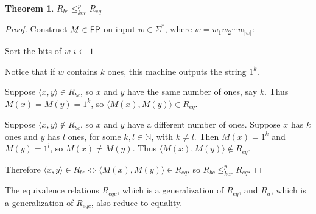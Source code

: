 \documentclass{article}
\newtheorem{theorem}{Theorem}[section]
\theoremstyle{definition} \newtheorem{definition}[definition]{Definition}
\newcommand{\sigmastar}{\Sigma^{*}} %
\newcommand{\kr}{\leq^{p}_{ker}} %
\newcommand{\pair}[2]{\langle#1,#2\rangle} %
\begin{document}
\begin{theorem}$R_{bc}\kr R_{eq}$\end{theorem}
\begin{proof}
  Construct $M\in {\ensuremath{\mathsf{FP}}}$ on input $w\in\sigmastar$, where $w=w_1w_2\cdots
  w_{|w|}$:\\
  \begin{algorithm}[H]
    Sort the bits of $w$\;
    $i\gets1$\;
  \end{algorithm}
  Notice that if $w$ contains $k$ ones, this machine outputs the string $1^k$.

  Suppose $\pair{x}{y}\in R_{bc}$, so $x$ and $y$ have the same number of ones,
  say $k$. Thus $M(x)=M(y)=1^k$, so $\pair{M(x)}{M(y)}\in R_{eq}$.
  
  Suppose $\pair{x}{y}\notin R_{bc}$, so $x$ and $y$ have a different number of
  ones. Suppose $x$ has $k$ ones and $y$ has $l$ ones, for some
  $k,l\in\mathbb{N}$, with $k\neq l$. Then $M(x)=1^{k}$ and $M(y)=1^{l}$, so
  $M(x)\neq M(y)$. Thus $\pair{M(x)}{M(y)}\notin R_{eq}$.

  Therefore $\pair{x}{y}\in R_{bc} \iff \pair{M(x)}{M(y)}\in R_{eq}$, so
  $R_{bc}\kr R_{eq}$.
\end{proof}

The equivalence relations $R_{eqc}$, which is a generalization of $R_{eq}$, and
$R_a$, which is a generalization of $R_{eqc}$, also reduce to equality.
\end{document}
